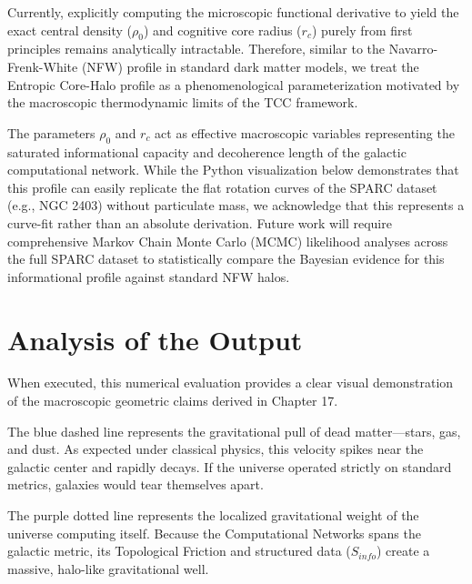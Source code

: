 \documentclass[12pt,openany]{book}
\theoremstyle{plain}
\theoremstyle{definition}
\theoremstyle{remark}
\begin{document}
Currently, explicitly computing the microscopic functional derivative to yield the exact central density ($\rho_0$) and cognitive core radius ($r_c$) purely from first principles remains analytically intractable. Therefore, similar to the Navarro-Frenk-White (NFW) profile in standard dark matter models, we treat the Entropic Core-Halo profile as a phenomenological parameterization motivated by the macroscopic thermodynamic limits of the TCC framework. 

The parameters $\rho_0$ and $r_c$ act as effective macroscopic variables representing the saturated informational capacity and decoherence length of the galactic computational network. While the Python visualization below demonstrates that this profile can easily replicate the flat rotation curves of the SPARC dataset (e.g., NGC 2403) without particulate mass, we acknowledge that this represents a curve-fit rather than an absolute derivation. Future work will require comprehensive Markov Chain Monte Carlo (MCMC) likelihood analyses across the full SPARC dataset to statistically compare the Bayesian evidence for this informational profile against standard NFW halos.

\begin{center}
\end{center}

\section{Analysis of the Output}

When executed, this numerical evaluation provides a clear visual demonstration of the macroscopic geometric claims derived in Chapter 17. 

The blue dashed line represents the gravitational pull of dead matter—stars, gas, and dust. As expected under classical physics, this velocity spikes near the galactic center and rapidly decays. If the universe operated strictly on standard metrics, galaxies would tear themselves apart. 

The purple dotted line represents the localized gravitational weight of the universe computing itself. Because the Computational Networks spans the galactic metric, its Topological Friction and structured data ($S_{info}$) create a massive, halo-like gravitational well. 
\end{document}
